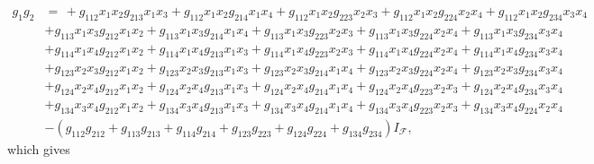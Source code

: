 \documentclass[aps,preprint]{revtex4}%
\begin{document}
\begin{align}
g_{1}g_{2}  &  =\,+\mathit{g}_{112}x_{1}x_{2}\mathit{g}_{213}x_{1}%
x_{3}+\mathit{g}_{112}x_{1}x_{2}\mathit{g}_{214}x_{1}x_{4}+\mathit{g}%
_{112}x_{1}x_{2}\mathit{g}_{223}x_{2}x_{3}+\mathit{g}_{112}x_{1}%
x_{2}\mathit{g}_{224}x_{2}x_{4}+\mathit{g}_{112}x_{1}x_{2}\mathit{g}%
_{234}x_{3}x_{4}\\
&  +\mathit{g}_{113}x_{1}x_{3}\mathit{g}_{212}x_{1}x_{2}+\mathit{g}_{113}%
x_{1}x_{3}\mathit{g}_{214}x_{1}x_{4}+\mathit{g}_{113}x_{1}x_{3}\mathit{g}%
_{223}x_{2}x_{3}+\mathit{g}_{113}x_{1}x_{3}\mathit{g}_{224}x_{2}%
x_{4}+\mathit{g}_{113}x_{1}x_{3}\mathit{g}_{234}x_{3}x_{4}\\
&  +\mathit{g}_{114}x_{1}x_{4}\mathit{g}_{212}x_{1}x_{2}+\mathit{g}_{114}%
x_{1}x_{4}\mathit{g}_{213}x_{1}x_{3}+\mathit{g}_{114}x_{1}x_{4}\mathit{g}%
_{223}x_{2}x_{3}+\mathit{g}_{114}x_{1}x_{4}\mathit{g}_{224}x_{2}%
x_{4}+\mathit{g}_{114}x_{1}x_{4}\mathit{g}_{234}x_{3}x_{4}\\
&  +\mathit{g}_{123}x_{2}x_{3}\mathit{g}_{212}x_{1}x_{2}+\mathit{g}_{123}%
x_{2}x_{3}\mathit{g}_{213}x_{1}x_{3}+\mathit{g}_{123}x_{2}x_{3}\mathit{g}%
_{214}x_{1}x_{4}+\mathit{g}_{123}x_{2}x_{3}\mathit{g}_{224}x_{2}%
x_{4}+\mathit{g}_{123}x_{2}x_{3}\mathit{g}_{234}x_{3}x_{4}\\
&  +\mathit{g}_{124}x_{2}x_{4}\mathit{g}_{212}x_{1}x_{2}+\mathit{g}_{124}%
x_{2}x_{4}\mathit{g}_{213}x_{1}x_{3}+\mathit{g}_{124}x_{2}x_{4}\mathit{g}%
_{214}x_{1}x_{4}+\mathit{g}_{124}x_{2}x_{4}\mathit{g}_{223}x_{2}%
x_{3}+\mathit{g}_{124}x_{2}x_{4}\mathit{g}_{234}x_{3}x_{4}\\
&  +\mathit{g}_{134}x_{3}x_{4}\mathit{g}_{212}x_{1}x_{2}+\mathit{g}_{134}%
x_{3}x_{4}\mathit{g}_{213}x_{1}x_{3}+\mathit{g}_{134}x_{3}x_{4}\mathit{g}%
_{214}x_{1}x_{4}+\mathit{g}_{134}x_{3}x_{4}\mathit{g}_{223}x_{2}%
x_{3}+\mathit{g}_{134}x_{3}x_{4}\mathit{g}_{224}x_{2}x_{4}\\
&  -\left(  \mathit{g}_{112}\mathit{g}_{212}+\mathit{g}_{113}\mathit{g}%
_{213}+\mathit{g}_{114}\mathit{g}_{214}+\mathit{g}_{123}\mathit{g}%
_{223}+\mathit{g}_{124}\mathit{g}_{224}+\mathit{g}_{134}\mathit{g}%
_{234}\right)  I_{\mathcal{F}},
\end{align}
which gives%
\end{document}
